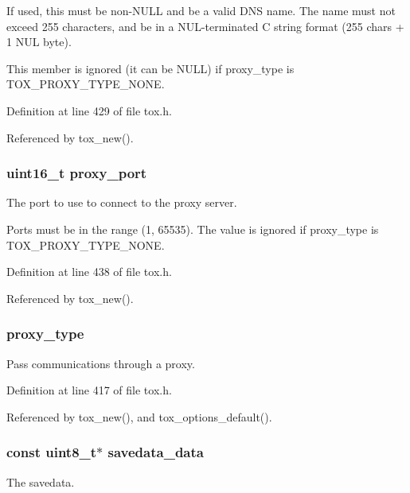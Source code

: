 If used, this must be non-\/\+N\+U\+L\+L and be a valid D\+N\+S name. The name must not exceed 255 characters, and be in a N\+U\+L-\/terminated C string format (255 chars + 1 N\+U\+L byte).

This member is ignored (it can be N\+U\+L\+L) if proxy\+\_\+type is T\+O\+X\+\_\+\+P\+R\+O\+X\+Y\+\_\+\+T\+Y\+P\+E\+\_\+\+N\+O\+N\+E. 

Definition at line 429 of file tox.\+h.



Referenced by tox\+\_\+new().

\hypertarget{struct_tox___options_a0693366412d32f9b8ceba1bf4f320132}{
\subsubsection[{proxy\+\_\+port}]{\setlength{\rightskip}{0pt plus 5cm}uint16\+\_\+t proxy\+\_\+port}}\label{struct_tox___options_a0693366412d32f9b8ceba1bf4f320132}
The port to use to connect to the proxy server.

Ports must be in the range (1, 65535). The value is ignored if proxy\+\_\+type is T\+O\+X\+\_\+\+P\+R\+O\+X\+Y\+\_\+\+T\+Y\+P\+E\+\_\+\+N\+O\+N\+E. 

Definition at line 438 of file tox.\+h.



Referenced by tox\+\_\+new().

\hypertarget{struct_tox___options_a32a512eb6e2c820735f1c51cd1075ce4}{
\subsubsection[{proxy\+\_\+type}]{ proxy\+\_\+type}}\label{struct_tox___options_a32a512eb6e2c820735f1c51cd1075ce4}
Pass communications through a proxy. 

Definition at line 417 of file tox.\+h.



Referenced by tox\+\_\+new(), and tox\+\_\+options\+\_\+default().

\hypertarget{struct_tox___options_af298081c5f07deace07b2ced2c0a9c3d}{
\subsubsection[{savedata\+\_\+data}]{\setlength{\rightskip}{0pt plus 5cm}const uint8\+\_\+t$\ast$ savedata\+\_\+data}}\label{struct_tox___options_af298081c5f07deace07b2ced2c0a9c3d}
The savedata. 

